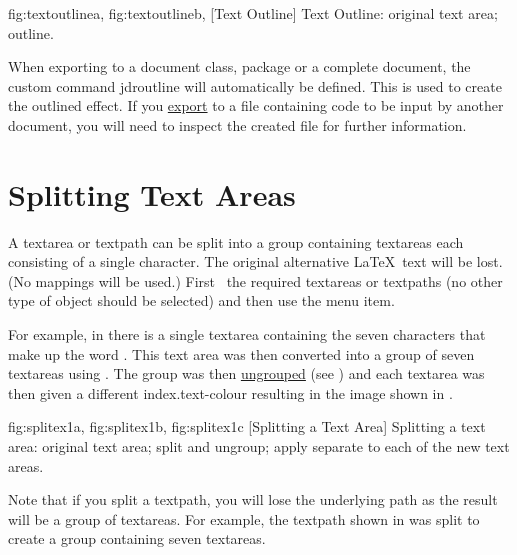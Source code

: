 {
 {fig:textoutlinea}{}{},
 {fig:textoutlineb}{}{},
}
[Text Outline]
{Text Outline:  original text area;
   outline.}

When exporting to a document class, package or a complete document,
the custom command \gls{jdroutline} will automatically be defined.
This is used to create the outlined effect. If you 
\hyperref[sec:exportpgf]{export} to a file containing 
code to be input by another document, you will need to inspect the 
created  file for further information.


\section{Splitting Text Areas}\label{sec:splittext}


A \gls{textarea} or \gls{textpath} can be split into a \gls{group}
containing \glspl{textarea} each consisting of a single character.
The original alternative \LaTeX\ text will be lost. (No mappings
will be used.) First \select\ the required \glspl{textarea} or
\glspl{textpath} (no other type of \gls{object} should be selected)
and then use the  menu item.

For example, in  there is a single 
\gls{textarea} containing the seven characters that make up the word
.  This text area was then converted into a group of
seven \glspl*{textarea} using . The group was
then \hyperref[sec:grouping]{ungrouped} (see ) 
and each \gls{textarea} was then given a different
\gls{index.text-colour} resulting in the image
shown in .

{
  {fig:splitex1a}{}{},
  {fig:splitex1b}{}{},
  {fig:splitex1c}{}{}
} 
[Splitting a Text Area]
{Splitting a text area:
 original text area;
 split and ungroup;
 apply separate  
to each of the new text areas.}

Note that if you split a \gls*{textpath}, you will lose the
underlying path as the result will be a group of \glspl{textarea}.
For example, the \gls*{textpath} shown in
 was split to create a group
containing seven \glspl*{textarea}.

